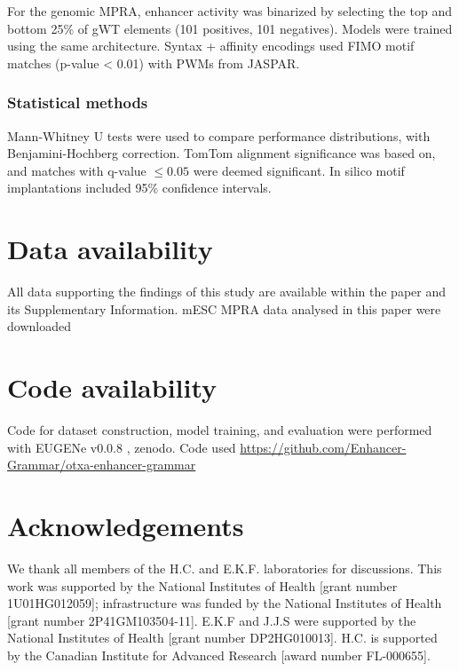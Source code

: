 For the genomic MPRA, enhancer activity was binarized by selecting the top and bottom 25\% of gWT elements (101 positives, 101 negatives). Models were trained using the same architecture. Syntax + affinity encodings used FIMO motif matches (p-value \textless{} 0.01) with PWMs from JASPAR\cite{Castro-Mondragon2022-kx}.

\subsubsection{Statistical methods}
Mann-Whitney U tests\cite{Mann1947-dw} were used to compare performance distributions, with Benjamini-Hochberg correction\cite{Benjamini1995-da}. TomTom alignment significance was based on\cite{Gupta2007-zw}, and matches with q-value \(\leq 0.05\) were deemed significant. In silico motif implantations included 95\% confidence intervals.

\section{Data availability}

All data supporting the findings of this study are available within the paper and its Supplementary Information. mESC MPRA data analysed in this paper were downloaded

\section{Code availability}

Code for dataset construction, model training, and evaluation were performed with EUGENe v0.0.8 \cite{Klie2023-yr}, {zenodo}. Code used \url{https://github.com/Enhancer-Grammar/otxa-enhancer-grammar}

\section{Acknowledgements}

We thank all members of the H.C. and E.K.F. laboratories  for discussions. This work was supported by the National Institutes of Health [grant number 1U01HG012059]; infrastructure was funded by the National Institutes of Health [grant number 2P41GM103504-11]. E.K.F and J.J.S were supported by the National Institutes of Health [grant number DP2HG010013]. H.C. is supported by the Canadian Institute for Advanced Research [award number FL-000655].

